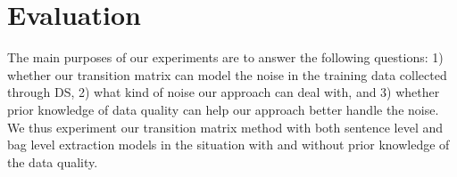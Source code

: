 \section{Evaluation}
The main purposes of our experiments are to answer the following questions: 1) whether our transition matrix can model the noise in the training data collected through DS, 2) what kind of noise our approach can deal with, and 3) whether prior knowledge of data quality can help our approach better handle the noise.  
We thus experiment our transition matrix method with both sentence level and bag level extraction models in the situation with and without prior knowledge of the data quality. 
